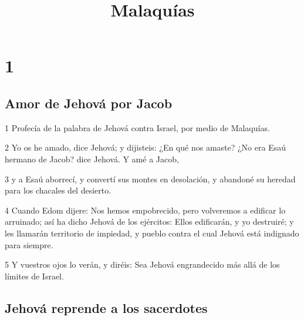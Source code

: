 

\title{Malaquías}

\chapter{1}

\section*{Amor de Jehová por Jacob}

\par 1 Profecía de la palabra de Jehová contra Israel, por medio de Malaquías.
\par 2 Yo os he amado, dice Jehová; y dijisteis: ¿En qué nos amaste? ¿No era Esaú hermano de Jacob? dice Jehová. Y amé a Jacob,
\par 3 y a Esaú aborrecí, y convertí sus montes en desolación, y abandoné su heredad para los chacales del desierto.
\par 4 Cuando Edom dijere: Nos hemos empobrecido, pero volveremos a edificar lo arruinado; así ha dicho Jehová de los ejércitos: Ellos edificarán, y yo destruiré; y les llamarán territorio de impiedad, y pueblo contra el cual Jehová está indignado para siempre.
\par 5 Y vuestros ojos lo verán, y diréis: Sea Jehová engrandecido más allá de los límites de Israel.

\section*{Jehová reprende a los sacerdotes}

